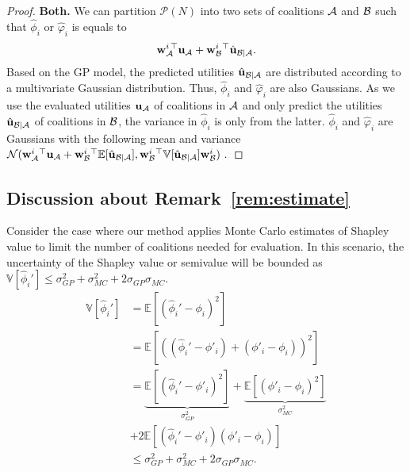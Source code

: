 \begin{proof}
\textbf{Both.}
We can partition $\mathcal{P}(N)$ into two sets of coalitions $\mathcal{A}$ and $\mathcal{B}$ such that $\hat{\phi}_i$ or $\hat{\varphi}_i$ is equals to 
\[
\mathbf{w}_{\mathcal{A}}^{i\,\top} \mathbf{u}_{\mathcal{A}} + \mathbf{w}_{\mathcal{B}}^i{}^\top \hat{\mathbf{u}}_{\mathcal{B}|\mathcal{A}} .
\]
Based on the GP model, the predicted utilities $\hat{\mathbf{u}}_{\mathcal{B}|\mathcal{A}}$ are distributed according to a multivariate Gaussian distribution. Thus, $\hat{\phi}_i$ and $\hat{\varphi}_i$ are also Gaussians.
As we use the evaluated utilities $\mathbf{u}_{\mathcal{A}}$ of coalitions in $\mathcal{A}$ and only predict the utilities $\hat{\mathbf{u}}_{\mathcal{B}|\mathcal{A}}$ of coalitions in $\mathcal{B}$, the variance in $\hat{\phi}_i$ is only from the latter.
$\hat{\phi}_i$ and $\hat{\varphi}_i$ are Gaussians with the following mean and variance
$\mathcal{N}( \mathbf{w}_{\cA}^i{}^\top \mathbf{u}_{\cA} + \mathbf{w}_{\cB}^i{}^\top \mathbb{E}[\hat{\mathbf{u}}_{\cB|\cA}], \mathbf{w}_{\cB}^i{}^\top \mathbb{V}[\hat{\mathbf{u}}_{\cB|\cA}] \mathbf{w}_{\cB}^i ) \ .$

\end{proof}

\subsection{Discussion about Remark~\ref{rem:estimate}}\label{app:uncer_dis}
 Consider the case where our method applies Monte Carlo estimates of Shapley value to limit the number of coalitions needed for evaluation. In this scenario, the uncertainty of the Shapley value or semivalue will be bounded as $\mathbb{V}[\hat{\phi}_i']  \leq \sigma_{GP}^2 + \sigma_{MC}^2 + 2 \sigma_{GP} \sigma_{MC}$.
\begin{align*}
    \mathbb{V}[\hat{\phi}_i'] &= \mathbb{E}[(\hat{\phi}_i' - \phi_i)^2] \\
    &= \mathbb{E}[((\hat{\phi}_i' - \phi'_i) + (\phi'_i - \phi_i))^2] \\
    &= \underbrace{\mathbb{E}[(\hat{\phi}_i' - \phi'_i)^2]}_{\sigma_{GP}^2} +   \underbrace{\mathbb{E}[(\phi'_i - \phi_i)^2]}_{\sigma_{MC}^2} \\
        &+ 2\mathbb{E}[(\hat{\phi}_i' - \phi'_i)(\phi'_i - \phi_i)] \\
    & \leq \sigma_{GP}^2 + \sigma_{MC}^2 + 2 \sigma_{GP} \sigma_{MC} .
\end{align*}


